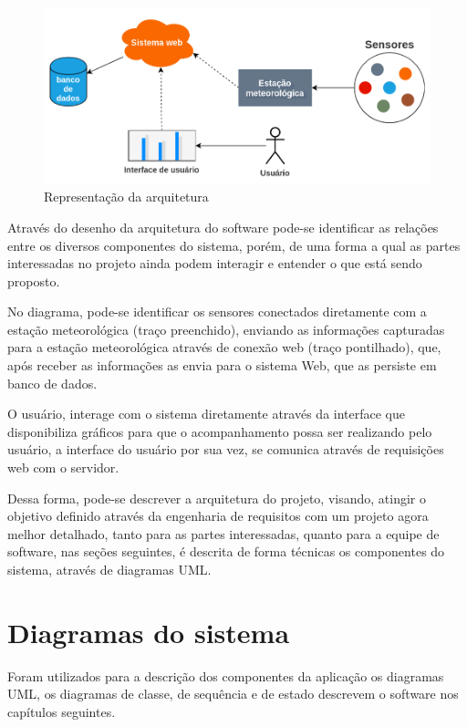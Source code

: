 \begin{center}
\begin{figure}[H]
    \centering
    \caption{Representação da arquitetura} \label{fig:figure_arq_macro}
    \includegraphics[scale=0.43]{diagrams/arq_macro.png}
    \hfill
{}
\end{figure}
\end{center}

Através do desenho da arquitetura do software pode-se identificar as relações entre os diversos componentes do sistema, porém, de uma forma a qual as partes interessadas no projeto ainda podem interagir e entender o que está sendo proposto.

No diagrama, pode-se identificar os sensores conectados diretamente com a estação meteorológica (traço preenchido), enviando as informações capturadas para a estação meteorológica através de conexão web (traço pontilhado), que, após receber as informações as envia para o sistema Web, que as persiste em banco de dados.

O usuário, interage com o sistema diretamente através da interface que disponibiliza gráficos para que o acompanhamento possa ser realizando pelo usuário, a interface do usuário por sua vez, se comunica através de requisições web com o servidor.

Dessa forma, pode-se descrever a arquitetura do projeto, visando, atingir o objetivo definido através da engenharia de requisitos com um projeto agora melhor detalhado, tanto para as partes interessadas, quanto para a equipe de software, nas seções seguintes, é descrita de forma técnicas os componentes do sistema, através de diagramas UML.

\chapter{Diagramas do sistema}

Foram utilizados para a descrição dos componentes da aplicação os diagramas UML, os diagramas de classe, de sequência e de estado descrevem o software nos capítulos seguintes.

